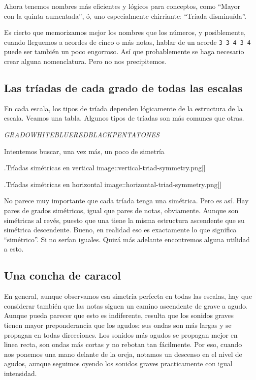 \documentclass[]{article}
\begin{document}
Ahora tenemos nombres más eficientes y lógicos para conceptos, como ``Mayor con la quinta aumentada'', ó, uno especialmente chirriante: ``Tríada disminuída''.

Es cierto que memorizamos mejor los nombres que los números, y posiblemente, cuando lleguemos a acordes de cinco o más notas, hablar de un acorde \texttt{3\ 3\ 4\ 3\ 4} puede ser también un poco engorroso. Así que probablemente se haga necesario crear alguna nomenclatura. Pero no nos precipitemos.

\subsection{Las tríadas de cada grado de todas las escalas}

En cada escala, los tipos de tríada dependen lógicamente de la estructura de la escala. Veamos una tabla. Algunos tipos de tríadas son más comunes que otras.

\emph{GRADO}\emph{WHITE}\emph{BLUE}\emph{RED}\emph{BLACK}\emph{PENTA}\emph{TONES}

Intentemos buscar, una vez más, un poco de simetría

.Tríadas simétricas en vertical image::vertical-triad-symmetry.png{[}{]}

.Tríadas simétricas en horizontal image::horizontal-triad-symmetry.png{[}{]}

No parece muy importante que cada tríada tenga una simétrica. Pero es así. Hay pares de grados simétricos, igual que pares de notas, obviamente. Aunque son simétricas al revés, puesto que una tiene la misma estructura ascendente que su simétrica descendente. Bueno, en realidad eso es exactamente lo que significa ``simétrico''. Si no serían iguales. Quizá más adelante encontremos alguna utilidad a esto.

\subsection{Una concha de caracol}

En general, aunque observamos esa simetría perfecta en todas las escalas, hay que considerar también que las notas siguen un camino ascendente de grave a agudo. Aunque pueda parecer que esto es indiferente, resulta que los sonidos graves tienen mayor preponderancia que los agudos: sus ondas son más largas y se propagan en todas direcciones. Los sonidos más agudos se propagan mejor en linea recta, son ondas más cortas y no rebotan tan fácilmente. Por eso, cuando nos ponemos una mano delante de la oreja, notamos un descenso en el nivel de agudos, aunque seguimos oyendo los sonidos graves practicamente con igual intensidad.
\end{document}
